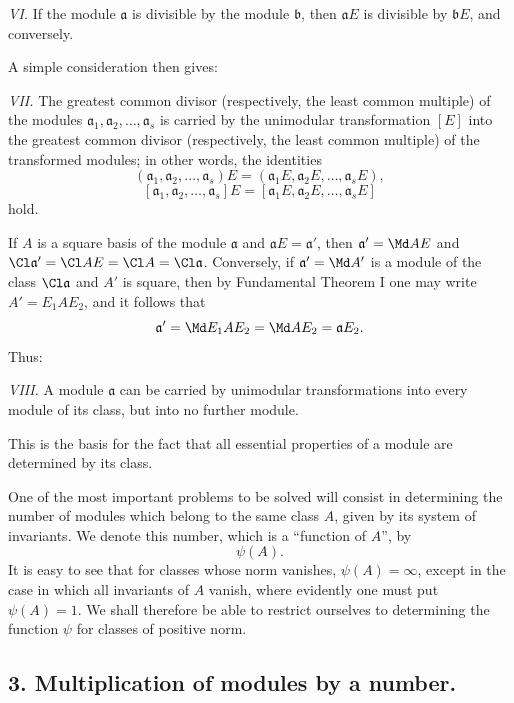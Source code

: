 \emph{VI.} If the module $\mathfrak a$ is divisible by the module $\mathfrak b$, then $\mathfrak aE$ is divisible by $\mathfrak bE$, and conversely.

A simple consideration then gives:

\emph{VII.} The greatest common divisor (respectively, the least common multiple) of the modules $\mathfrak a_1,\mathfrak a_2,\ldots,\mathfrak a_s$ is carried by the unimodular transformation $[E]$ into the greatest common divisor (respectively, the least common multiple) of the transformed modules; in other words, the identities
\[
 (\mathfrak a_1,\mathfrak a_2,\ldots,\mathfrak a_s)E
 =(\mathfrak a_1E,\mathfrak a_2E,\ldots,\mathfrak a_sE),
\]
\[
 [\mathfrak a_1,\mathfrak a_2,\ldots,\mathfrak a_s]E
 =[\mathfrak a_1E,\mathfrak a_2E,\ldots,\mathfrak a_sE]
\]
hold.

If $A$ is a square basis of the module $\mathfrak a$ and $\mathfrak aE=\mathfrak a'$, then $\mathfrak a'=\Md AE$ and $\Cl\mathfrak a'=\Cl AE=\Cl A=\Cl\mathfrak a$. Conversely, if $\mathfrak a'=\Md A'$ is a module of the class $\Cl\mathfrak a$ and $A'$ is square, then by Fundamental Theorem I one may write $A'=E_1AE_2$, and it follows that
\[
 \mathfrak a'=\Md E_1AE_2=\Md AE_2=\mathfrak aE_2.
\]
Thus:

\emph{VIII.} A module $\mathfrak a$ can be carried by unimodular transformations into every module of its class, but into no further module.

This is the basis for the fact that all essential properties of a module are determined by its class.

One of the most important problems to be solved will consist in determining the number of modules which belong to the same class $A$, given by its system of invariants. We denote this number, which is a ``function of $A$'', by
\[
 \psi(A).
\]
It is easy to see that for classes whose norm vanishes, $\psi(A)=\infty$, except in the case in which all invariants of $A$ vanish, where evidently one must put $\psi(A)=1$. We shall therefore be able to restrict ourselves to determining the function $\psi$ for classes of positive norm.

\subsection*{3. Multiplication of modules by a number.}


